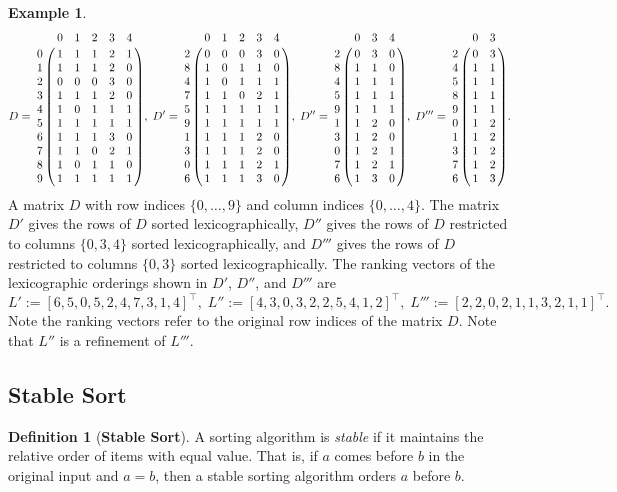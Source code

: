 \documentclass[a4paper,10pt,reqno]{amsart}
\theoremstyle{definition}
\newtheorem{definition}{Definition}
\newtheorem{example}{Example}
\begin{document}
\begin{example}
$$D = 
\bordermatrix{
  & 0 & 1 & 2 & 3 & 4 \cr
0 & 1 & 1 & 1 & 2 & 1 \cr
1 & 1 & 1 & 1 & 2 & 0 \cr
2 & 0 & 0 & 0 & 3 & 0 \cr
3 & 1 & 1 & 1 & 2 & 0 \cr
4 & 1 & 0 & 1 & 1 & 1 \cr
5 & 1 & 1 & 1 & 1 & 1 \cr
6 & 1 & 1 & 1 & 3 & 0 \cr
7 & 1 & 1 & 0 & 2 & 1 \cr
8 & 1 & 0 & 1 & 1 & 0 \cr
9 & 1 & 1 & 1 & 1 & 1 }, \;
D' = 
\bordermatrix{
  & 0 & 1 & 2 & 3 & 4 \cr
2 & 0 & 0 & 0 & 3 & 0 \cr
8 & 1 & 0 & 1 & 1 & 0 \cr
4 & 1 & 0 & 1 & 1 & 1 \cr
7 & 1 & 1 & 0 & 2 & 1 \cr
5 & 1 & 1 & 1 & 1 & 1 \cr
9 & 1 & 1 & 1 & 1 & 1 \cr
1 & 1 & 1 & 1 & 2 & 0 \cr
3 & 1 & 1 & 1 & 2 & 0 \cr
0 & 1 & 1 & 1 & 2 & 1 \cr
6 & 1 & 1 & 1 & 3 & 0 }, \;
D'' = 
\bordermatrix{
  & 0 & 3 & 4 \cr
2 & 0 & 3 & 0 \cr
8 & 1 & 1 & 0 \cr
4 & 1 & 1 & 1 \cr
5 & 1 & 1 & 1 \cr
9 & 1 & 1 & 1 \cr
1 & 1 & 2 & 0 \cr
3 & 1 & 2 & 0 \cr
0 & 1 & 2 & 1 \cr
7 & 1 & 2 & 1 \cr
6 & 1 & 3 & 0 }, \;
D''' =
\bordermatrix{
  & 0 & 3 \cr
2 & 0 & 3 \cr
4 & 1 & 1 \cr
5 & 1 & 1 \cr
8 & 1 & 1 \cr
9 & 1 & 1 \cr
0 & 1 & 2 \cr
1 & 1 & 2 \cr
3 & 1 & 2 \cr
7 & 1 & 2 \cr
6 & 1 & 3 }.
$$
A matrix $D$ with row indices $\{0,\ldots,9\}$ and column indices
$\{0,\ldots,4\}$. The matrix $D'$ gives the rows of $D$ sorted
lexicographically, $D''$ gives the rows of $D$ restricted to columns
$\{0,3,4\}$ sorted lexicographically, and $D'''$ gives the rows of $D$
restricted to columns $\{0,3\}$ sorted lexicographically.  The ranking vectors
of the lexicographic orderings shown in $D'$, $D''$, and $D'''$ are $$ L' :=
[6,5,0,5,2,4,7,3,1,4]^\top, \; L'' := [4,3,0,3,2,2,5,4,1,2]^\top, \; L''' :=
[2,2,0,2,1,1,3,2,1,1]^\top.$$ Note the ranking vectors refer to the original
row indices of the matrix $D$.  Note that $L''$ is a refinement of $L'''$.
\label{ex:D}
\end{example}
    
\subsection{Stable Sort}
\begin{definition}[\bf Stable Sort]
A sorting algorithm is \emph{stable} if it maintains the relative order of
items with equal value. That is, if $a$ comes before $b$ in the original input
and $a = b$, then a stable sorting algorithm orders $a$ before $b$.
\end{definition}
\end{document}
